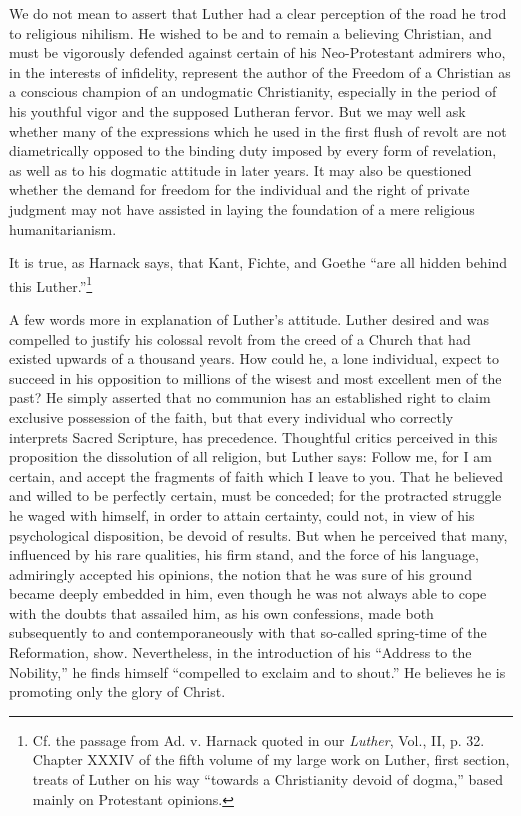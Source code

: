We do not mean to assert that Luther had a clear perception of the
road he trod to religious nihilism. He wished to be and to remain a
believing Christian, and must be vigorously defended against certain
of his Neo-Protestant admirers who, in the interests of infidelity,
represent the author of the Freedom of a Christian as a conscious
champion of an undogmatic Christianity, especially in the period of
his youthful vigor and the supposed Lutheran fervor. But we may
well ask whether many of the expressions which he used in the
first flush of revolt are not diametrically opposed to the binding duty
imposed by every form of revelation, as well as to his dogmatic attitude
in later years. It may also be questioned whether the demand for
freedom for the individual and the right of private judgment may
not have assisted in laying the foundation of a mere religious humanitarianism.

It is true, as Harnack says, that Kant, Fichte, and Goethe “are all
hidden behind this Luther.”\footnote
{Cf. the passage from Ad. v. Harnack quoted in our \textit{Luther}, Vol., II, p. 32. Chapter
XXXIV of the fifth volume of my large work on Luther, first section, treats of Luther on
his way “towards a Christianity devoid of dogma,” based mainly on Protestant opinions.}

A few words more in explanation of Luther’s attitude. Luther
desired and was compelled to justify his colossal revolt from the creed
of a Church that had existed upwards of a thousand years. How could
he, a lone individual, expect to succeed in his opposition to millions
of the wisest and most excellent men of the past? He simply asserted
that no communion has an established right to claim exclusive possession
of the faith, but that every individual who correctly interprets
Sacred Scripture, has precedence. Thoughtful critics perceived
in this proposition the dissolution of all religion, but Luther says:
Follow me, for I am certain, and accept the fragments of faith which
I leave to you. That he believed and willed to be perfectly certain,
must be conceded; for the protracted struggle he waged with himself,
in order to attain certainty, could not, in view of his psychological
disposition, be devoid of results. But when he perceived that many,
influenced by his rare qualities, his firm stand, and the force of his
language, admiringly accepted his opinions, the notion that he was
sure of his ground became deeply embedded in him, even though
he was not always able to cope with the doubts that assailed him, as
his own confessions, made both subsequently to and contemporaneously with
that so-called spring-time of the Reformation, show.
Nevertheless, in the introduction of his “Address to the Nobility,”
he finds himself “compelled to exclaim and to shout.” He believes he
is promoting only the glory of Christ.


